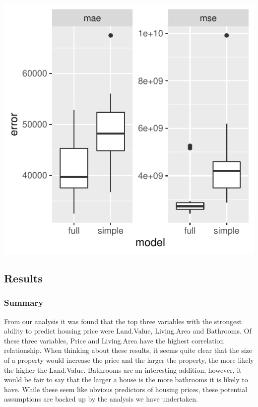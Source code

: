 \documentclass[letterpaper,9pt,twocolumn,twoside,]{pinp}
\begin{document}
\begin{center}\includegraphics{Final-Report_files/figure-latex/unnamed-chunk-18-1} \end{center}

\hypertarget{results}{%
\subsection{Results}\label{results}}

\hypertarget{summary}{%
\subsubsection{Summary}\label{summary}}

From our analysis it was found that the top three variables with the
strongest ability to predict housing price were Land.Value, Living.Area
and Bathrooms. Of these three variables, Price and Living.Area have the
highest correlation relationship. When thinking about these results, it
seems quite clear that the size of a property would increase the price
and the larger the property, the more likely the higher the Land.Value.
Bathrooms are an interesting addition, however, it would be fair to say
that the larger a house is the more bathrooms it is likely to have.
While these seem like obvious predictors of housing prices, these
potential assumptions are backed up by the analysis we have undertaken.
\end{document}
